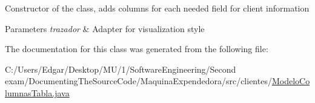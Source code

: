 Constructor of the class, adds columns for each needed field for client information 
\begin{DoxyParams}{Parameters}
{\em trazador} & Adapter for visualization style \\
\hline
\end{DoxyParams}


The documentation for this class was generated from the following file\+:\begin{DoxyCompactItemize}
\item 
C\+:/\+Users/\+Edgar/\+Desktop/\+M\+U/1/\+Software\+Engineering/\+Second exam/\+Documenting\+The\+Source\+Code/\+Maquina\+Expendedora/src/clientes/\mbox{\hyperlink{_modelo_columnas_tabla_8java}{Modelo\+Columnas\+Tabla.\+java}}\end{DoxyCompactItemize}
